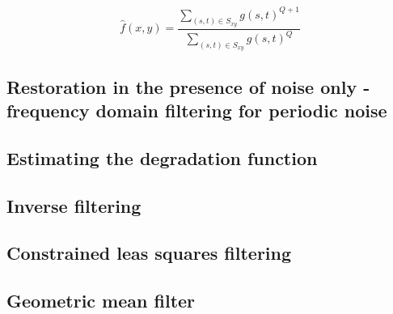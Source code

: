 \begin{equation}
	\hat{f}(x,y)= \frac{\sum\limits_{(s,t)\in S_{xy}} g(s,t)^{Q+1}}{\sum\limits_{(s,t)\in S_{xy}} g(s,t)^Q}
\end{equation}


\subsection{Restoration in the presence of noise only - frequency domain filtering for periodic noise}


\subsection{Estimating the degradation function}


\subsection{Inverse filtering}


\subsection{Constrained leas squares filtering}


\subsection{Geometric mean filter}

